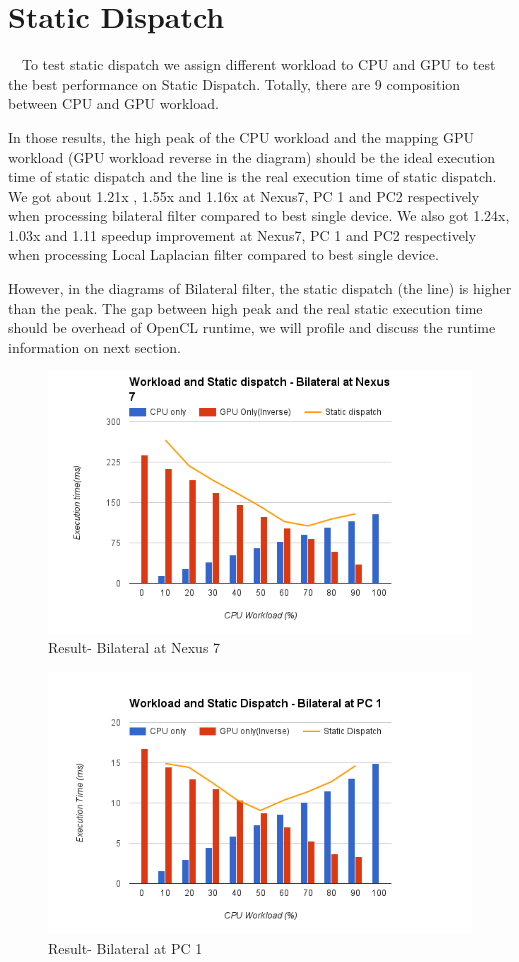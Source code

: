 \section{Static Dispatch}

\quad \ \ To test static dispatch we assign different workload to CPU and GPU to test the best performance on Static Dispatch. Totally, there are 9 composition between CPU and GPU workload.

In those results, the high peak of the CPU workload and the mapping GPU workload (GPU workload reverse in the diagram) should be the ideal execution time of static dispatch and the line is the real execution time of static dispatch. We got about 1.21x , 1.55x and 1.16x at Nexus7, PC 1 and PC2 respectively when processing bilateral filter compared to best single device. We also got 1.24x, 1.03x and 1.11 speedup improvement at Nexus7, PC 1 and PC2 respectively  when processing Local Laplacian filter compared to best single device. 

However, in the diagrams of Bilateral filter, the static dispatch (the line) is higher than the peak. The gap between high peak and the real static execution time should be overhead of OpenCL runtime, we will profile and discuss the runtime information on next section.

\begin{figure}[hbtp]
\centering
\includegraphics[width=12cm]{img/Result-WorkloadAndStaticDispatch(Bilateral@Nexus7)}
\caption{Result- Bilateral at Nexus 7 }
\label{fig:my_label}
\end{figure}

\begin{figure}[hbtp]
\centering
\includegraphics[width=12cm]{img/Result-WorkloadAndStaticDispatch(Bilateral@PC1)}
\caption{Result- Bilateral at PC 1 }
\label{fig:my_label}
\end{figure}

